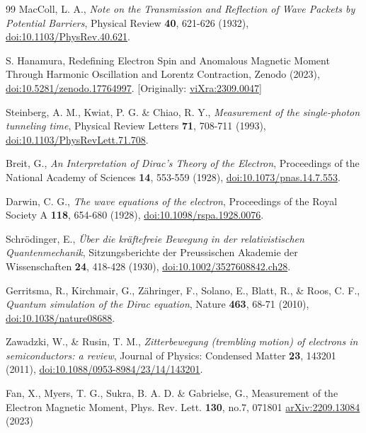 \documentclass[%
 reprint,
 amsmath,amssymb,
 aps,
]{revtex4-1}
\numberwithin{equation}{section}%
\begin{document}
\begin{thebibliography}{99}
MacColl, L. A.,
\textit{Note on the Transmission and Reflection of Wave Packets by Potential Barriers},
Physical Review \textbf{40}, 621-626 (1932),
\href{https://doi.org/10.1103/PhysRev.40.621}{doi:10.1103/PhysRev.40.621}.

S. Hanamura, Redefining Electron Spin and Anomalous Magnetic Moment Through Harmonic Oscillation and Lorentz Contraction, Zenodo (2023), \href{https://doi.org/10.5281/zenodo.17764997}{doi:10.5281/zenodo.17764997}. [Originally: \href{https://vixra.org/abs/2309.0047}{viXra:2309.0047}]

Steinberg, A. M., Kwiat, P. G. \& Chiao, R. Y.,
\textit{Measurement of the single-photon tunneling time},
Physical Review Letters \textbf{71}, 708-711 (1993),
\href{https://doi.org/10.1103/PhysRevLett.71.708}{doi:10.1103/PhysRevLett.71.708}.

Breit, G.,
\textit{An Interpretation of Dirac's Theory of the Electron},
Proceedings of the National Academy of Sciences \textbf{14}, 553-559 (1928),
\href{https://doi.org/10.1073/pnas.14.7.553}{doi:10.1073/pnas.14.7.553}.

Darwin, C. G.,
\textit{The wave equations of the electron},
Proceedings of the Royal Society A \textbf{118}, 654-680 (1928),
\href{https://doi.org/10.1098/rspa.1928.0076}{doi:10.1098/rspa.1928.0076}.

Schrödinger, E.,
\textit{Über die kräftefreie Bewegung in der relativistischen Quantenmechanik},
Sitzungsberichte der Preussischen Akademie der Wissenschaften \textbf{24}, 418-428 (1930),
\href{https://doi.org/10.1002/3527608842.ch28}{doi:10.1002/3527608842.ch28}.

Gerritsma, R., Kirchmair, G., Zähringer, F., Solano, E., Blatt, R., \& Roos, C. F.,
\textit{Quantum simulation of the Dirac equation},
Nature \textbf{463}, 68-71 (2010),
\href{https://doi.org/10.1038/nature08688}{doi:10.1038/nature08688}.

Zawadzki, W., \& Rusin, T. M.,
\textit{Zitterbewegung (trembling motion) of electrons in semiconductors: a review},
Journal of Physics: Condensed Matter \textbf{23}, 143201 (2011),
\href{https://doi.org/10.1088/0953-8984/23/14/143201}{doi:10.1088/0953-8984/23/14/143201}.


Fan, X., Myers, T. G., Sukra, B. A. D. \& Gabrielse, G., Measurement of the Electron Magnetic Moment, Phys. Rev. Lett. \textbf{130}, no.7, 071801 \href{https://arxiv.org/abs/2209.13084}{arXiv:2209.13084} (2023)

\end{thebibliography}



\end{document}
